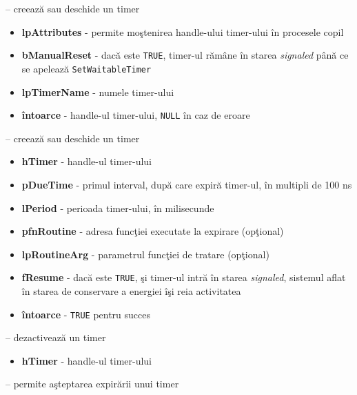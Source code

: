 \documentclass{refcard.cs.pub.ro}
\begin{document}
\begin{multicols*}{3}
 -- creează sau deschide un timer
\begin{itemize}
  \item \textbf{lpAttributes} - permite moştenirea handle-ului timer-ului în procesele copil
  \item \textbf{bManualReset} - dacă este \texttt{TRUE}, timer-ul rămâne în starea \emph{signaled} până ce se apelează \texttt{SetWaitableTimer}
  \item \textbf{lpTimerName} - numele timer-ului
  \item \textbf{întoarce} - handle-ul timer-ului, \texttt{NULL} în caz de eroare
\end{itemize}

 -- creează sau deschide un timer
\begin{itemize}
  \item \textbf{hTimer} - handle-ul timer-ului
  \item \textbf{pDueTime} - primul interval, după care expiră timer-ul, în multipli de 100 ns
  \item \textbf{lPeriod} - perioada timer-ului, în milisecunde
  \item \textbf{pfnRoutine} - adresa funcţiei executate la expirare (opţional)
  \item \textbf{lpRoutineArg} - parametrul funcţiei de tratare (opţional)
  \item \textbf{fResume} - dacă este \texttt{TRUE}, şi timer-ul intră în starea \emph{signaled}, sistemul aflat în starea de conservare a energiei îşi reia activitatea
  \item \textbf{întoarce} - \texttt{TRUE} pentru succes
\end{itemize}

 -- dezactivează un timer
\begin{itemize}
  \item \textbf{hTimer} - handle-ul timer-ului
\end{itemize}

 -- permite aşteptarea expirării unui timer

\end{multicols*}
\end{document}

